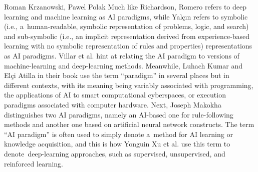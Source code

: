 \begin{artengenv2auth}{Roman Krzanowski, Pawel Polak}
Much like Richardson, Romero
\parencite*[][]{romero_unpopular_2021} %
 refers to deep learning and machine learning as AI paradigms, while Yalçın 
\parencite*[][]{osaba_artificial_2021} %
 refers to symbolic (i.e., a~human-readable, symbolic representation of problems, logic, and search) and sub-symbolic (i.e., an implicit representation derived from experience-based learning with no symbolic representation of rules and properties) representations as AI paradigms. Villar et al. 
\parencite*[][]{xu_artificial_2021} %
 hint at relating the AI paradigm to versions of machine-learning and deep-learning methods. Meanwhile, Luhach Kumar and El\c{c}i Atilla 
\parencite*[][]{luhach_artificial_2021} %
 in their book use the term ``paradigm'' in several places but in different contexts, with its meaning being variably associated with programming, the applications of AI to smart computational cyberspaces, or execution paradigms associated with computer hardware. Next, Joseph Makokha 
\parencite*[][]{makokha_artificial_2021} %
 distinguishes two AI paradigms, namely an AI-based one for rule-following methods and another one based on artificial neural network constructs. The term ``AI paradigm'' is often used to simply denote a~method for AI learning or knowledge acquisition, and this is how Yonguin Xu et al. 
\parencite*[][]{xu_artificial_2021} %
 use this term to denote~deep-learning approaches, such as supervised, unsupervised, and reinforced learning.


\end{artengenv2auth}
